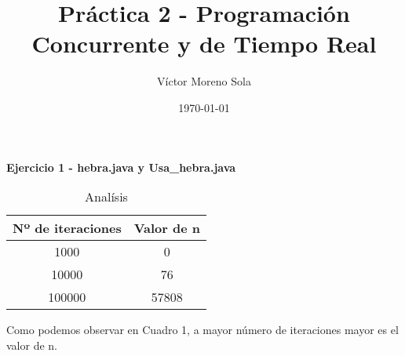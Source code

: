\documentclass[12pt]{article}
\title{Práctica 2 - Programación Concurrente y de Tiempo Real}
\author{Víctor Moreno Sola}
\date{\today}
\begin{document}
\maketitle

\textbf{Ejercicio 1 - hebra.java y Usa\_hebra.java}
    \begin{table}[h!]
        \centering
        \begin{tabular}{c|c}
         Nº de iteraciones & Valor de n \\
         \hline
         1000 & 0 \\
         10000 & 76 \\
         100000 & 57808 \\
        \end{tabular}
        \caption{Analísis}
        \label{tab:Tabla 1}
    \end{table}
    
    Como podemos observar en Cuadro 1, a mayor número de iteraciones mayor es el valor de n.
\end{document}
